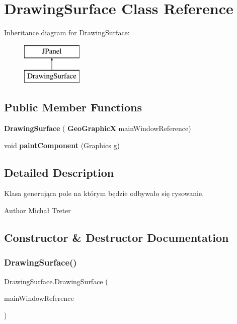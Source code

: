 \section{Drawing\+Surface Class Reference}
\label{class_drawing_surface}
Inheritance diagram for Drawing\+Surface\+:\begin{figure}[H]
\begin{center}
\leavevmode
\includegraphics[height=2.000000cm]{class_drawing_surface}
\end{center}
\end{figure}
\subsection*{Public Member Functions}
\begin{DoxyCompactItemize}
\item 
\textbf{ Drawing\+Surface} (\textbf{ Geo\+GraphicX} main\+Window\+Reference)
\item 
\mbox{\label{class_drawing_surface_a5fec875fb243f233a23432403c6c3015}} 
void {\bfseries paint\+Component} (Graphics g)
\end{DoxyCompactItemize}


\subsection{Detailed Description}
Klasa generująca pole na którym będzie odbywało się rysowanie. \begin{DoxyAuthor}{Author}
Michał Treter 
\end{DoxyAuthor}


\subsection{Constructor \& Destructor Documentation}
\mbox{\label{class_drawing_surface_a7b0d154f706e1c4db872475e426f5d7a}} 
\subsubsection{Drawing\+Surface()}
{\footnotesize\ttfamily Drawing\+Surface.\+Drawing\+Surface (\begin{DoxyParamCaption}\item[{\textbf{ Geo\+GraphicX}}]{main\+Window\+Reference }\end{DoxyParamCaption})}

